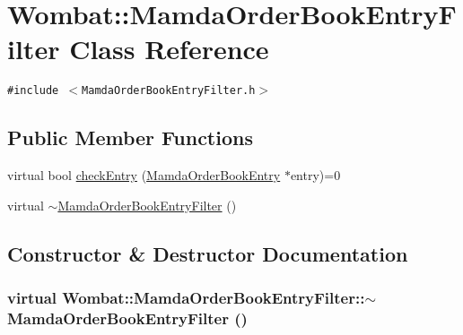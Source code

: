 \hypertarget{classWombat_1_1MamdaOrderBookEntryFilter}{
\section{Wombat::Mamda\-Order\-Book\-Entry\-Filter Class Reference}
\label{classWombat_1_1MamdaOrderBookEntryFilter}
}
{\tt \#include $<$Mamda\-Order\-Book\-Entry\-Filter.h$>$}

\subsection*{Public Member Functions}
\begin{CompactItemize}
\item 
virtual bool \hyperlink{classWombat_1_1MamdaOrderBookEntryFilter_20aee34e2dbaf411a6fa06d98fd41411}{check\-Entry} (\hyperlink{classWombat_1_1MamdaOrderBookEntry}{Mamda\-Order\-Book\-Entry} $\ast$entry)=0
\item 
virtual \hyperlink{classWombat_1_1MamdaOrderBookEntryFilter_c0bbd33515441d13f0383be373c3321d}{$\sim$Mamda\-Order\-Book\-Entry\-Filter} ()
\end{CompactItemize}


\subsection{Constructor \& Destructor Documentation}
\hypertarget{classWombat_1_1MamdaOrderBookEntryFilter_c0bbd33515441d13f0383be373c3321d}{
\subsubsection[$\sim$MamdaOrderBookEntryFilter]{\setlength{\rightskip}{0pt plus 5cm}virtual Wombat::Mamda\-Order\-Book\-Entry\-Filter::$\sim$Mamda\-Order\-Book\-Entry\-Filter ()}}
\label{classWombat_1_1MamdaOrderBookEntryFilter_c0bbd33515441d13f0383be373c3321d}




